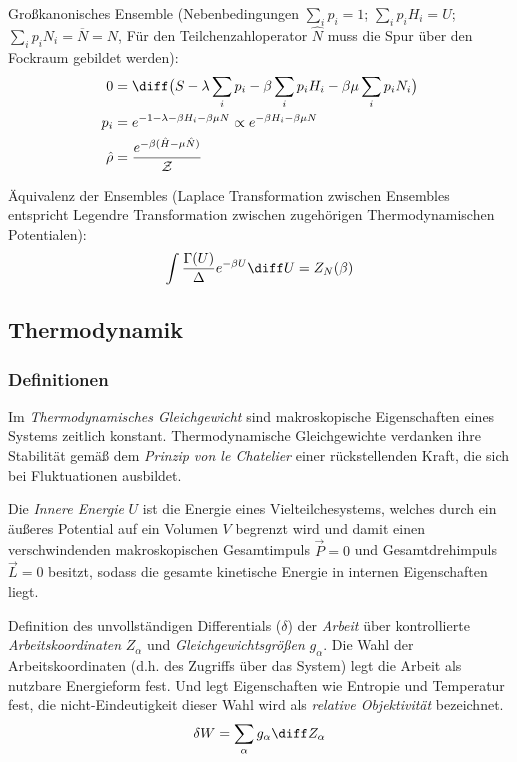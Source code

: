 \documentclass[11pt]{article}
\numberwithin{equation}{section}
\begin{document}
				\noindent
				Großkanonisches Ensemble (Nebenbedingungen $\sum_i p_i = 1$; $\sum_i p_i H_i = U$; $\sum_i p_i N_i = \overline{N} = N$, Für den Teilchenzahloperator $\hat{N}$ muss die Spur über den Fockraum gebildet werden):
				\begin{equation}
					\begin{aligned}
						0 &= \diff \big( S - \lambda \sum_i p_i - \beta \sum_i p_i H_i - \beta\mu \sum_i p_i N_i \big) \\
						p_i &= e^{-1-\lambda-\beta H_i-\beta\mu N} \propto e^{-\beta H_i - \beta\mu N} \\
						\hat{\rho} &= \frac{e^{-\beta (\hat{H} - \mu \hat{N})}}{\mathcal{Z}} \\
					\end{aligned}
				\end{equation}

				\noindent
				Äquivalenz der Ensembles (Laplace Transformation zwischen Ensembles entspricht Legendre Transformation zwischen zugehörigen Thermodynamischen Potentialen):
				\begin{equation}
					\int \frac{\Gamma(U)}{\Delta} e^{-\beta U} \diff U = Z_N(\beta)
				\end{equation}


		\subsection{Thermodynamik}
			\subsubsection{Definitionen}
				Im \emph{Thermodynamisches Gleichgewicht} sind makroskopische Eigenschaften eines Systems zeitlich konstant. Thermodynamische Gleichgewichte verdanken ihre Stabilität gemäß dem \emph{Prinzip von le Chatelier} einer rückstellenden Kraft, die sich bei Fluktuationen ausbildet. \vsp

				Die \emph{Innere Energie} $U$ ist die Energie eines Vielteilchesystems, welches durch ein äußeres Potential auf ein Volumen $V$ begrenzt wird und damit einen verschwindenden makroskopischen Gesamtimpuls $\vec{P}=0$ und Gesamtdrehimpuls $\vec{L} = 0$ besitzt, sodass die gesamte kinetische Energie in internen Eigenschaften liegt. \vsp

				Definition des unvollständigen Differentials ($\delta$) der \emph{Arbeit} über kontrollierte \emph{Arbeitskoordinaten} $Z_\alpha$ und \emph{Gleichgewichtsgrößen} $g_\alpha$. Die Wahl der Arbeitskoordinaten (d.h. des Zugriffs über das System) legt die Arbeit als nutzbare Energieform fest. Und legt Eigenschaften wie Entropie und Temperatur fest, die nicht-Eindeutigkeit dieser Wahl wird als \emph{relative Objektivität} bezeichnet.
				\begin{equation}
					\delta W = \sum_\alpha g_\alpha \diff Z_\alpha
				\end{equation} \vsp
\end{document}
